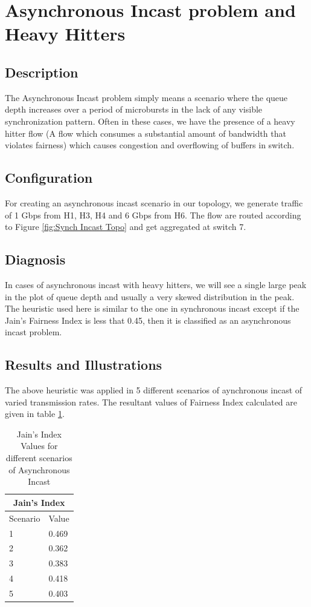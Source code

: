 \section{Asynchronous Incast problem and Heavy Hitters}
\subsection{Description}
The Asynchronous Incast problem simply means a scenario where the queue depth increases over a period of microbursts
in the lack of any visible synchronization pattern. Often in these cases, we have the presence of a heavy hitter flow
(A flow which consumes a substantial amount of bandwidth that violates fairness) which causes congestion and overflowing
of buffers in switch.
\subsection{Configuration}
For creating an asynchronous incast scenario in our topology, we generate traffic of 1 Gbps from H1, H3, H4 and 6 Gbps from H6. The flow are routed
according to Figure \ref{fig:Synch Incast Topo} and get aggregated at switch 7.
\subsection{Diagnosis}
In cases of asynchronous incast with heavy hitters, we will see a single large peak in the plot of queue depth and usually a very
skewed distribution in the peak. The heuristic used here is similar to the one in synchronous incast except if the Jain's 
Fairness Index is less that 0.45, then it is classified as an asynchronous incast problem.
\subsection{Results and Illustrations}

The above heuristic was applied in 5 different scenarios of aynchronous incast of varied transmission rates.
The resultant values of Fairness Index calculated are given in table \ref{tab:J_Index_Async}.
\begin{table}[h]
	\begin{center}
	\begin{tabular}{ |p{3cm}|p{3cm}|  }
		\hline
		\multicolumn{2}{|c|}{Jain's Index} \\
		\hline
		Scenario & Value \\
		\hline
		1 & 0.469 \\
		2 & 0.362 \\
		3 & 0.383 \\
		4 & 0.418 \\
		5 & 0.403 \\
		\hline
	   \end{tabular}
	\end{center}
	
	\caption{Jain's Index Values for different scenarios of Asynchronous Incast}
	\label{tab:J_Index_Async}
	\end{table}


